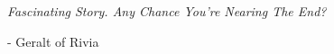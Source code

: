 \pagestyle{empty}
\vspace*{0.2\textheight}

{\itshape Fascinating Story. Any Chance You're Nearing The End?\bigbreak}

\hfill - Geralt of Rivia
